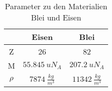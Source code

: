 \begin{table}[h!]
  \centering
  \caption{Parameter zu den Materialien Blei und Eisen}
  \label{tab:par}
  \begin{tabular}{c c c}
    \toprule
    & Eisen & Blei  \\
    \midrule
    Z      & 26                   & 82 \\
    M      & $\SI{55,845}{u N_{A}}$       & $\SI{207,2}{u N_{A}}$ \\
    $\rho$ & $\SI{7874}{\frac{kg}{m^3}}$  & $\SI{11342}{\frac{kg}{m^3}}$ \\

    \bottomrule
  \end{tabular}
\end{table}
